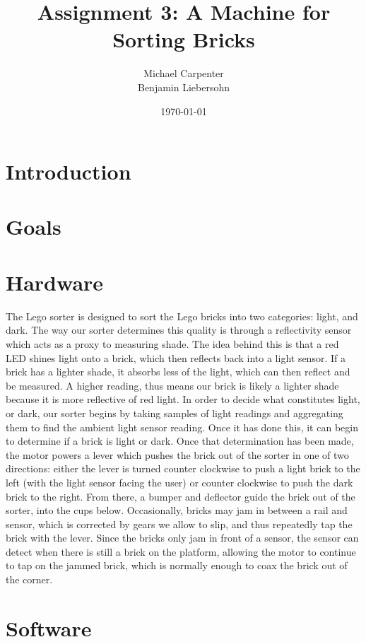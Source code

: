 \documentclass{article}
\title{Assignment 3: A Machine for Sorting Bricks}
\author{Michael Carpenter \\ Benjamin Liebersohn}
\date{\today}
\begin{document}
\maketitle

\section{Introduction}

\section{Goals}

\section{Hardware}
The Lego sorter is designed to sort the Lego bricks into two categories: light, and dark. The way our sorter determines this quality is through a reflectivity sensor which acts as a proxy to measuring shade. The idea behind this is that a red LED shines light onto a brick, which then reflects back into a light sensor. If a brick has a lighter shade, it absorbs less of the light, which can then reflect and be measured. A higher reading, thus means our brick is likely a lighter shade because it is more reflective of red light. In order to decide what constitutes light, or dark, our sorter begins by taking samples of light readings and aggregating them to find the ambient light sensor reading. Once it has done this, it can begin to determine if a brick is light or dark. Once that determination has been made, the motor powers a lever which pushes the brick out of the sorter in one of two directions: either the lever is turned counter clockwise to push a light brick to the left (with the light sensor facing the user) or counter clockwise to push the dark brick to the right. From there, a bumper and deflector guide the brick out of the sorter, into the cups below. Occasionally, bricks may jam in between a rail and sensor, which is corrected by gears we allow to slip, and thus repeatedly tap the brick with the lever. Since the bricks only jam in front of a sensor, the sensor can detect when there is still a brick on the platform, allowing the motor to continue to tap on the jammed brick, which is normally enough to coax the brick out of the corner.
\section{Software}
\end{document}
